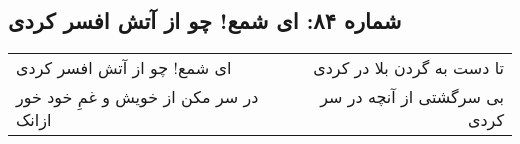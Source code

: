 \begin{center}
\section*{شماره ۸۴: ای شمع! چو از آتش افسر کردی}
\label{sec:084}
\begin{longtable}{l p{0.5cm} r}
ای شمع! چو از آتش افسر کردی
&&
تا دست به گردن بلا در کردی
\\
در سر مکن از خویش و غمِ خود خور ازانک
&&
بی سرگشتی از آنچه در سر کردی
\\
\end{longtable}
\end{center}
